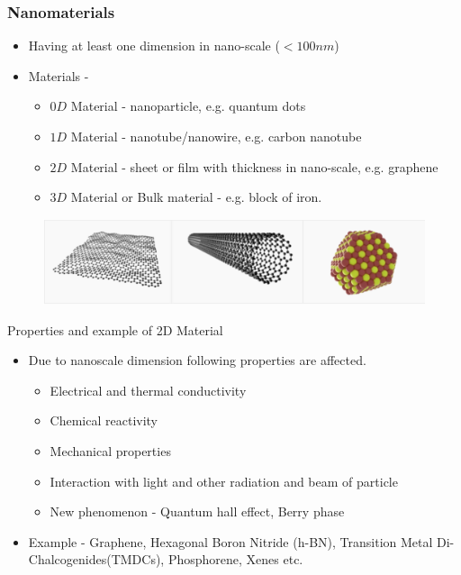 \documentclass{beamer}
\begin{document}
\begin{frame}
\frametitle{Nanomaterials}
\begin{itemize}
    \item Having at least one dimension in nano-scale ($< 100 nm$)
    \item Materials - 
    \begin{itemize}
        \item $0D$ Material - nanoparticle, e.g. quantum dots
        \item $1D$ Material - nanotube/nanowire, e.g. carbon nanotube
        \item $2D$ Material - sheet or film with thickness in nano-scale, e.g. graphene
        \item $3D$ Material or Bulk material - e.g. block of iron.
    \end{itemize}
\end{itemize}
\begin{figure}
    \centering
    \includegraphics[scale=0.5]{nanomaterial.PNG}
\end{figure}

\end{frame}

\begin{frame}{Properties and example of 2D Material}
    \begin{itemize}
    \setlength\itemsep{2em}
    \item Due to nanoscale dimension following properties are affected.
    \begin{itemize}
        \item Electrical and thermal conductivity
        \item Chemical reactivity
        \item Mechanical properties
        \item Interaction with light and other radiation and beam of particle
        \item New phenomenon - Quantum hall effect, Berry phase
    \end{itemize}
    \item Example - Graphene, Hexagonal Boron Nitride (h-BN), Transition Metal Di-Chalcogenides(TMDCs), Phosphorene, Xenes etc.
\end{itemize}
\end{frame}
\end{document}

